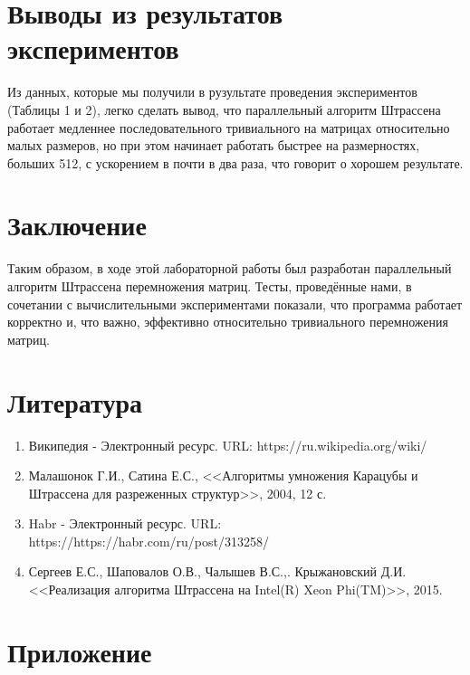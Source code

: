 \documentclass{report}
\begin{document}
\newpage

\section*{Выводы из результатов экспериментов}
Из данных, которые мы получили в рузультате проведения экспериментов (Таблицы 1 и 2),  легко сделать вывод, что параллельный алгоритм Штрассена работает медленнее последовательного тривиального на матрицах относительно малых размеров, но при этом начинает работать быстрее на размерностях, больших 512, с ускорением в почти в два раза, что говорит о хорошем результате.

\newpage

\section*{Заключение}
Таким образом, в ходе этой лабораторной работы был разработан параллельный алгоритм Штрассена перемножения матриц. Тесты, проведённые нами, в сочетании с вычислительными экспериментами показали, что программа работает корректно и, что важно, эффективно относительно тривиального перемножения матриц.
\newpage

\section*{Литература}
\begin{enumerate}
\item Википедия - Электронный ресурс. URL: https://ru.wikipedia.org/wiki/
\item Малашонок Г.И., Сатина Е.С., <<Алгоритмы умножения Карацубы и Штрассена для разреженных структур>>, 2004, 12 с.
\item Habr - Электронный ресурс. URL: https://https://habr.com/ru/post/313258/
\item Сергеев Е.С., Шаповалов О.В., Чалышев В.С.,. Крыжановский Д.И. <<Реализация алгоритма Штрассена на Intel(R) Xeon Phi(TM)>>, 2015.
\end{enumerate} 
\newpage

\section*{Приложение}
\end{document}
